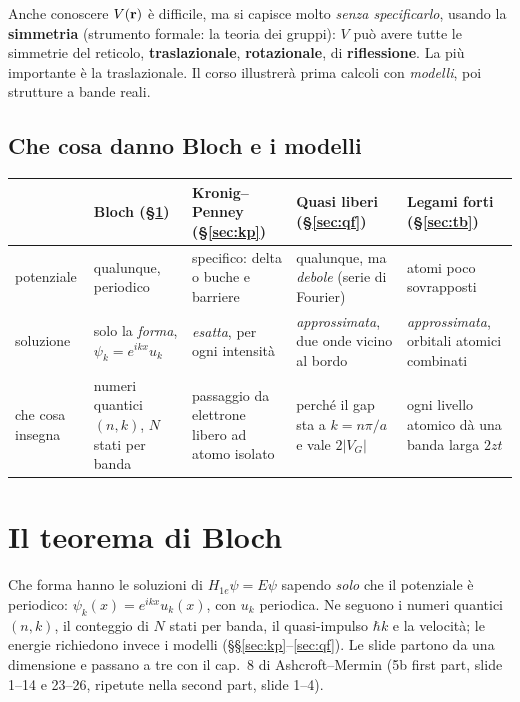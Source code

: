 \documentclass[11pt,a4paper]{article}
\begin{document}
Anche conoscere $V(\mathbf r)$ è difficile, ma si capisce molto \emph{senza specificarlo}, usando la \textbf{simmetria} (strumento formale: la teoria dei
gruppi): $V$ può avere tutte le simmetrie del reticolo, \textbf{traslazionale}, \textbf{rotazionale}, di \textbf{riflessione}. La più importante è la
traslazionale. Il corso illustrerà prima calcoli con \emph{modelli}, poi strutture a bande reali.

\subsection{Che cosa danno Bloch e i modelli}
\begin{center}\small
\begin{tabularx}{\linewidth}{@{}l*{4}{>{\raggedright\arraybackslash}X}@{}}
\toprule
& \textbf{Bloch} (§\ref{sec:bloch}) & \textbf{Kronig--Penney} (§\ref{sec:kp}) & \textbf{Quasi liberi} (§\ref{sec:qf}) & \textbf{Legami forti} (§\ref{sec:tb})\\
\midrule
potenziale & qualunque, periodico & specifico: delta o buche e barriere & qualunque, ma \emph{debole} (serie di Fourier) & atomi poco sovrapposti\\
soluzione & solo la \emph{forma}, $\psi_k=e^{ikx}u_k$ & \emph{esatta}, per ogni intensità & \emph{approssimata}, due onde vicino al bordo & \emph{approssimata}, orbitali atomici combinati\\
che cosa insegna & numeri quantici $(n,k)$, $N$ stati per banda & passaggio da elettrone libero ad atomo isolato & perché il gap sta a $k=n\pi/a$ e vale $2|V_G|$ & ogni livello atomico dà una banda larga $2zt$\\
\bottomrule
\end{tabularx}
\end{center}

\section{Il teorema di Bloch}\label{sec:bloch}
Che forma hanno le soluzioni di $H_{1e}\psi=E\psi$ sapendo \emph{solo} che il potenziale è periodico: $\psi_k(x)=e^{ikx}u_k(x)$, con $u_k$ periodica. Ne
seguono i numeri quantici $(n,k)$, il conteggio di $N$ stati per banda, il quasi-impulso $\hbar k$ e la velocità; le energie richiedono invece i modelli
(§§\ref{sec:kp}--\ref{sec:qf}). Le slide partono da una dimensione e passano a tre con il cap.~8 di Ashcroft--Mermin (5b first part, slide 1--14 e 23--26,
ripetute nella second part, slide 1--4).
\end{document}
